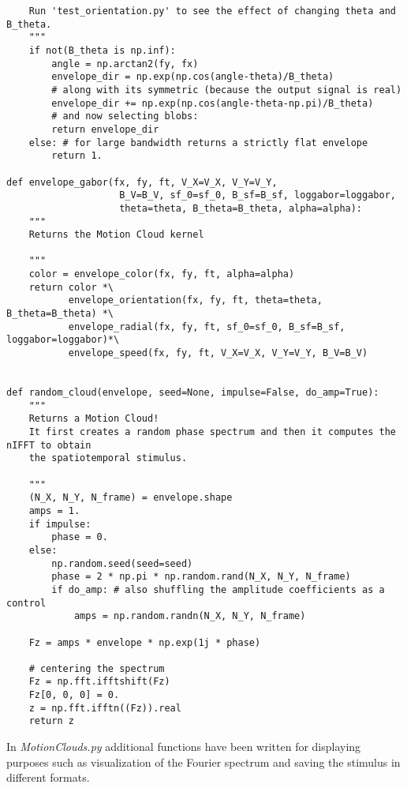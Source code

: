 \documentclass[a4paper,11pt]{article}%
\begin{document}
\begin{lstlisting}
    Run 'test_orientation.py' to see the effect of changing theta and B_theta.
    """
    if not(B_theta is np.inf):
        angle = np.arctan2(fy, fx)
        envelope_dir = np.exp(np.cos(angle-theta)/B_theta)
        # along with its symmetric (because the output signal is real)
        envelope_dir += np.exp(np.cos(angle-theta-np.pi)/B_theta)
        # and now selecting blobs:
        return envelope_dir
    else: # for large bandwidth returns a strictly flat envelope
        return 1.

def envelope_gabor(fx, fy, ft, V_X=V_X, V_Y=V_Y,
                    B_V=B_V, sf_0=sf_0, B_sf=B_sf, loggabor=loggabor,
                    theta=theta, B_theta=B_theta, alpha=alpha):
    """
    Returns the Motion Cloud kernel

    """
    color = envelope_color(fx, fy, ft, alpha=alpha)
    return color *\
           envelope_orientation(fx, fy, ft, theta=theta, B_theta=B_theta) *\
           envelope_radial(fx, fy, ft, sf_0=sf_0, B_sf=B_sf, loggabor=loggabor)*\
           envelope_speed(fx, fy, ft, V_X=V_X, V_Y=V_Y, B_V=B_V)


def random_cloud(envelope, seed=None, impulse=False, do_amp=True):
    """
    Returns a Motion Cloud!
    It first creates a random phase spectrum and then it computes the nIFFT to obtain
    the spatiotemporal stimulus.

    """
    (N_X, N_Y, N_frame) = envelope.shape
    amps = 1.
    if impulse:
        phase = 0.
    else:
        np.random.seed(seed=seed)
        phase = 2 * np.pi * np.random.rand(N_X, N_Y, N_frame)
        if do_amp: # also shuffling the amplitude coefficients as a control
            amps = np.random.randn(N_X, N_Y, N_frame)

    Fz = amps * envelope * np.exp(1j * phase)
    
    # centering the spectrum
    Fz = np.fft.ifftshift(Fz)
    Fz[0, 0, 0] = 0.
    z = np.fft.ifftn((Fz)).real  
    return z
\end{lstlisting}

In \textit{MotionClouds.py} additional functions have been written for displaying purposes such as visualization of the Fourier spectrum and saving the stimulus in different formats.
\end{document}
